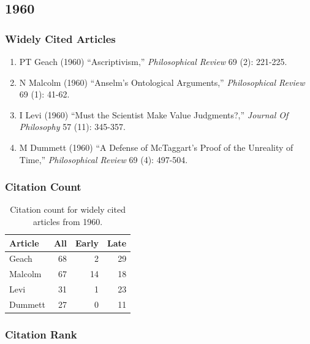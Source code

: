 \documentclass[
  10pt,
  letterpaper,
  DIV=11,
  numbers=noendperiod,
  twoside]{scrartcl}
\providecommand{\tightlist}{%
  \setlength{\itemsep}{0pt}\setlength{\parskip}{0pt}}\usepackage{longtable,booktabs,array}
\begin{document}
\newpage

\subsection{1960}\label{sec-s1960}

\subsubsection*{Widely Cited Articles}\label{widely-cited-articles-4}

\begin{enumerate}
\def\labelenumi{\arabic{enumi}.}
\tightlist
\item
  PT Geach (1960) ``Ascriptivism,'' \emph{Philosophical Review} 69 (2):
  221-225.
\item
  N Malcolm (1960) ``Anselm's Ontological Arguments,''
  \emph{Philosophical Review} 69 (1): 41-62.
\item
  I Levi (1960) ``Must the Scientist Make Value Judgments?,''
  \emph{Journal Of Philosophy} 57 (11): 345-357.
\item
  M Dummett (1960) ``A Defense of McTaggart's Proof of the Unreality of
  Time,'' \emph{Philosophical Review} 69 (4): 497-504.
\end{enumerate}

\subsubsection*{Citation Count}\label{sec-count-1960}

\begin{longtable}[]{@{}lrrr@{}}

\caption{\label{tbl-citation-count-1960}Citation count for widely cited
articles from 1960.}

\tabularnewline

\toprule\noalign{}
Article & All & Early & Late \\
\midrule\noalign{}
\endhead
\bottomrule\noalign{}
\endlastfoot
Geach & 68 & 2 & 29 \\
Malcolm & 67 & 14 & 18 \\
Levi & 31 & 1 & 23 \\
Dummett & 27 & 0 & 11 \\

\end{longtable}

\subsubsection*{Citation Rank}\label{sec-rank-1960}
\end{document}
